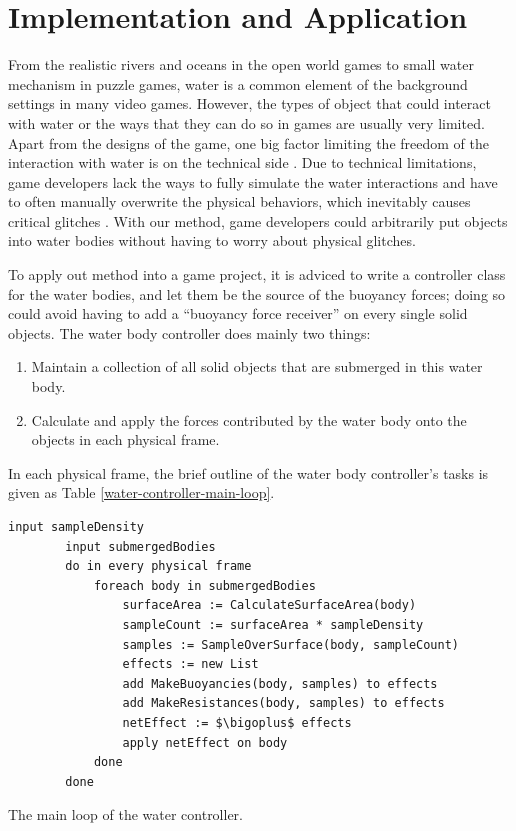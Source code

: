 \section{Implementation and Application}

From the realistic rivers and oceans in the open world games to small water mechanism in puzzle games,
water is a common element of the background settings in many video games.
However, the types of object that could interact with water or the ways that they can do so in games are usually very limited.
Apart from the designs of the game, one big factor limiting the freedom of the interaction with water is on the technical side \cite{kellomaki2012water}.
Due to technical limitations, game developers lack the ways to fully simulate the water interactions and have to often manually overwrite the physical behaviors, which inevitably causes critical glitches \cite{RedditAssassin}.
With our method, game developers could arbitrarily put objects into water bodies without having to worry about physical glitches.

To apply out method into a game project, it is adviced to write a controller class for the water bodies, and let them be the source of the buoyancy forces;
doing so could avoid having to add a ``buoyancy force receiver'' on every single solid objects.
The water body controller does mainly two things:
\begin{enumerate}
	\item Maintain a collection of all solid objects that are submerged in this water body.
	\item Calculate and apply the forces contributed by the water body onto the objects in each physical frame.
\end{enumerate}

In each physical frame, the brief outline of the water body controller's tasks is given as Table \ref{water-controller-main-loop}.

\begin{table}[htb]
	\centering
	\begin{lstlisting}[style=pseudo]
		input sampleDensity
		input submergedBodies
		do in every physical frame
			foreach body in submergedBodies
				surfaceArea := CalculateSurfaceArea(body)
				sampleCount := surfaceArea * sampleDensity
				samples := SampleOverSurface(body, sampleCount)
				effects := new List
				add MakeBuoyancies(body, samples) to effects
				add MakeResistances(body, samples) to effects
				netEffect := $\bigoplus$ effects
				apply netEffect on body
			done
		done
	\end{lstlisting}
	\caption{The main loop of the water controller.}
	\label{water-controller-main-loop}
\end{table}

